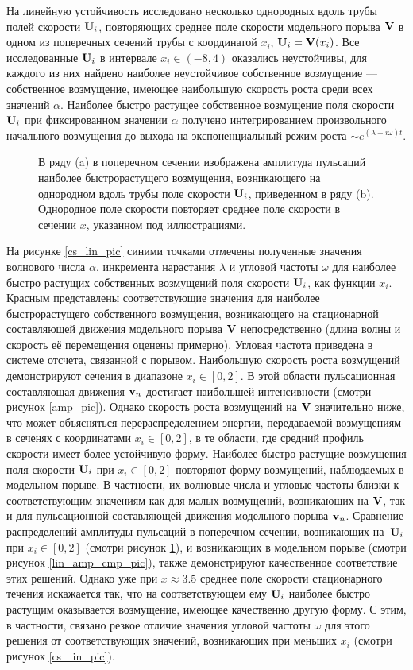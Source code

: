 На линейную устойчивость исследовано несколько однородных вдоль трубы полей скорости $\mathbf{U}_i$, повторяющих среднее поле скорости модельного порыва $\mathbf{V}$ в одном из поперечных сечений трубы с координатой $x_i$, $\mathbf{U}_i=\mathbf{V}(x_i)$. Все исследованные $\mathbf{U}_i$ в интервале $x_i \in (-8, 4)$ оказались неустойчивы, для каждого из них найдено наиболее неустойчивое собственное возмущение --- собственное возмущение, имеющее наибольшую скорость роста среди всех значений $\alpha$. Наиболее быстро растущее собственное возмущение поля скорости $\mathbf{U}_i$ при фиксированном значении $\alpha$ получено интегрированием произвольного начального возмущения до выхода на экспоненциальный режим роста $\sim e^{(\lambda + i\omega) t}$. 

\begin{figure}
\caption{В ряду (a) в поперечном сечении изображена амплитуда пульсаций наиболее быстрорастущего возмущения, возникающего на однородном вдоль трубы поле скорости $\mathbf{U}_i$, приведенном в ряду (b). Однородное поле скорости повторяет среднее поле скорости в сечении $x$, указанном под иллюстрациями.}
\label{cs_lin_map_pic}
\end{figure}

На рисунке \ref{cs_lin_pic} синими точками отмечены полученные значения волнового числа $\alpha$, инкремента нарастания $\lambda$ и угловой частоты $\omega$ для наиболее быстро растущих собственных возмущений поля скорости $\mathbf{U}_i$, как функции $x_i$. Красным представлены соответствующие значения для наиболее быстрорастущего собственного возмущения, возникающего на стационарной составляющей движения модельного порыва $\mathbf{V}$ непосредственно (длина волны и скорость её перемещения оценены примерно). Угловая частота приведена в системе отсчета, связанной с порывом. Наибольшую скорость роста возмущений демонстрируют сечения в диапазоне $x_i \in [0, 2]$. В этой области пульсационная составляющая движения $\mathbf{v}_n$ достигает наибольшей интенсивности (смотри рисунок \ref{amp_pic}). Однако скорость роста возмущений на $\mathbf{V}$ значительно ниже, что может объясняться перераспределением энергии, передаваемой возмущениям в сеченях с координатами $x_i \in [0, 2]$, в те области, где средний профиль скорости имеет более устойчивую форму. Наиболее быстро растущие возмущения поля скорости $\mathbf{U}_i$ при $x_i \in [0,2]$ повторяют форму возмущений, наблюдаемых в модельном порыве. В частности, их волновые числа и угловые частоты близки к соответствующим значениям как для малых возмущений, возникающих на $\mathbf{V}$, так и для пульсационной составляющей движения модельного порыва $\mathbf{v}_n$. Сравнение распределений амплитуды пульсаций в поперечном сечении, возникающих на~$\mathbf{U}_i$ при $x_i \in [0,2]$ (смотри рисунок \ref{cs_lin_map_pic}), и возникающих в модельном порыве (смотри рисунок \ref{lin_amp_cmp_pic}), также демонстрируют качественное соответствие этих решений. Однако уже при $x \approx 3.5$ среднее поле скорости стационарного течения искажается так, что на соответствующем ему $\mathbf{U}_i$ наиболее быстро растущим оказывается возмущение, имеющее качественно другую форму. С этим, в частности, связано резкое отличие значения угловой частоты $\omega$ для этого решения от соответствующих значений, возникающих при меньших $x_i$ (смотри рисунок \ref{cs_lin_pic}). 

